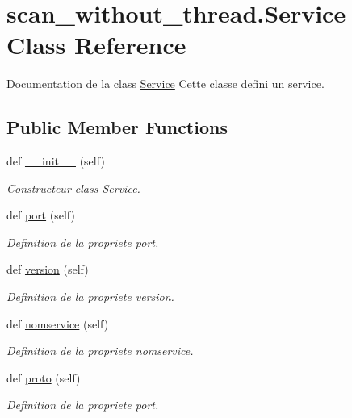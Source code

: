\hypertarget{classscan__without__thread_1_1Service}{}\section{scan\+\_\+without\+\_\+thread.\+Service Class Reference}
\label{classscan__without__thread_1_1Service}


Documentation de la class \hyperlink{classscan__without__thread_1_1Service}{Service} Cette classe defini un service.  


\subsection*{Public Member Functions}
\begin{DoxyCompactItemize}
\item 
def \hyperlink{classscan__without__thread_1_1Service_aa238b76a28ec8b49b504e9f27a57996d}{\+\_\+\+\_\+init\+\_\+\+\_\+} (self)
\begin{DoxyCompactList}\small\item\em Constructeur class \hyperlink{classscan__without__thread_1_1Service}{Service}. \end{DoxyCompactList}\item 
def \hyperlink{classscan__without__thread_1_1Service_a9864cacf5c379a4e4d6d380352091703}{port} (self)
\begin{DoxyCompactList}\small\item\em Definition de la propriete port. \end{DoxyCompactList}\item 
def \hyperlink{classscan__without__thread_1_1Service_a64d99ba899e83d37521657afdde0a470}{version} (self)
\begin{DoxyCompactList}\small\item\em Definition de la propriete version. \end{DoxyCompactList}\item 
def \hyperlink{classscan__without__thread_1_1Service_a73dd1605ff43abe5d14fff3721007c81}{nomservice} (self)
\begin{DoxyCompactList}\small\item\em Definition de la propriete nomservice. \end{DoxyCompactList}\item 
def \hyperlink{classscan__without__thread_1_1Service_af8f2466514fa8fcff62c04bf194b7767}{proto} (self)
\begin{DoxyCompactList}\small\item\em Definition de la propriete port. \end{DoxyCompactList}\item 

\end{DoxyCompactItemize}
